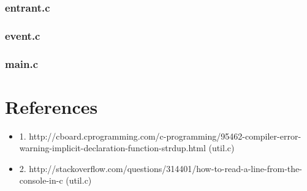 \documentclass[a4paper, twoside]{article}
\begin{document}
\subsubsection{entrant.c}

\subsubsection{event.c}

\subsubsection{main.c}


\section{References}
\begin{itemize}
\item{1. http://cboard.cprogramming.com/c-programming/95462-compiler-error-warning-implicit-declaration-function-strdup.html (util.c)}
\item{2. http://stackoverflow.com/questions/314401/how-to-read-a-line-from-the-console-in-c (util.c)}
\end{itemize}
\end{document}
